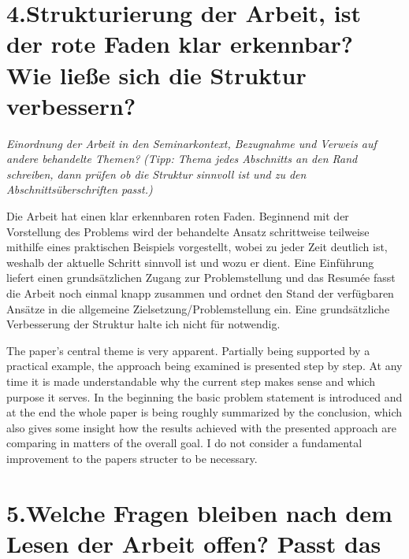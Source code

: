 \documentclass{article}
\begin{document}
\section{4.\hspace*{0.5em}Strukturierung der Arbeit, ist der rote Faden klar erkennbar? Wie ließe sich die Struktur verbessern?}\label{sec-strukturierung-der-arbeit-ist-der-rote-faden-klar-erkennbar-wie-liee-sich-die-struktur-verbessern}%

\noindent{}   \emph{Einordnung der Arbeit in den Seminarkontext, Bezugnahme und Verweis auf andere behandelte Themen?} 
   \emph{(Tipp: Thema jedes Abschnitts an den Rand schreiben, dann prüfen ob
   die Struktur sinnvoll ist und zu den Abschnittsüberschriften
   passt.)}%

   Die Arbeit hat einen klar erkennbaren roten Faden. Beginnend mit der Vorstellung des Problems wird der behandelte Ansatz schrittweise teilweise mithilfe eines praktischen Beispiels vorgestellt, wobei zu jeder Zeit deutlich ist, weshalb der aktuelle Schritt sinnvoll ist und wozu er dient. Eine Einführung liefert einen grundsätzlichen Zugang zur Problemstellung und das Resumée fasst die Arbeit noch einmal knapp zusammen und ordnet den Stand der verfügbaren Ansätze in die allgemeine Zielsetzung/Problemstellung ein. Eine grundsätzliche Verbesserung der Struktur halte ich nicht für notwendig.%

\mdhr{}%

\noindent{}   The paper's central theme is very apparent. Partially being supported by a practical example, the approach being examined is presented step by step. At any time it is made understandable why the current step makes sense and which purpose it serves. In the beginning the basic problem statement is introduced and at the end the whole paper is being roughly summarized by the conclusion, which also gives some insight how the results achieved with the presented approach are comparing in matters of the overall goal. I do not consider a fundamental improvement to the papers structer to be necessary.%

\section{5.\hspace*{0.5em}Welche Fragen bleiben nach dem Lesen der Arbeit offen? Passt das}\label{sec-welche-fragen-bleiben-nach-dem-lesen-der-arbeit-offen-passt-das}%
\end{document}
